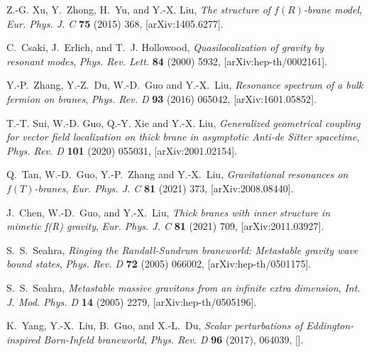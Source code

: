 \begin{thebibliography}{99}
Z.-G. Xu, Y.~Zhong, H.~Yu, and Y.-X. Liu, \emph{{The structure of $f(R)$-brane
  model}}, {\emph{Eur.
  Phys. J. C} {\bfseries 75} (2015) 368},
  [{{\ttfamily arXiv:1405.6277}}].

C.~Csaki, J.~Erlich, and T.~J. Hollowood, \emph{{Quasilocalization of gravity by
  resonant modes}},
 {\emph{Phys. Rev. Lett.}
  {\bfseries 84} (2000) 5932},
  [{{\ttfamily arXiv:hep-th/0002161}}].

Y.-P.~Zhang, Y.-Z.~Du, W.-D.~Guo and Y.-X.~Liu,
\emph{{Resonance spectrum of a bulk fermion on branes}},
{\emph{Phys. Rev. D}  {\bfseries93} (2016) 065042},
[{{\ttfamily arXiv:1601.05852}}].


T.-T. Sui, W.-D. Guo, Q.-Y. Xie and Y.-X. Liu,
\emph{{Generalized geometrical coupling for vector field localization on thick brane in asymptotic Anti-de
  Sitter spacetime}},
 {\emph{Phys. Rev. D}  {\bfseries101} (2020) 055031},
  [{{\ttfamily arXiv:2001.02154}}].



Q.~Tan, W.-D.~Guo, Y.-P.~Zhang and Y.-X.~Liu,
\emph{Gravitational resonances on $f(T)$-branes},
{\emph{Eur. Phys. J. C} {\bfseries 81} (2021) 373},
[{{\ttfamily arXiv:2008.08440}}].

J.~Chen, W.-D.~Guo, and Y.-X.~Liu,
\emph{Thick branes with inner structure in mimetic f(R) gravity},
{\emph{Eur. Phys. J. C} {\bfseries 81} (2021) 709},
[{{\ttfamily arXiv:2011.03927}}].

S.~S.~Seahra,
\emph{Ringing the Randall-Sundrum braneworld: Metastable gravity wave bound states},
{\emph{Phys. Rev. D} {\bfseries  72} (2005) 066002},
[{{\ttfamily arXiv:hep-th/0501175}}].

S.~S.~Seahra,
\emph{Metastable massive gravitons from an infinite extra dimension},
{\emph{Int. J. Mod. Phys. D} {\bfseries  14} (2005) 2279},
[{{\ttfamily arXiv:hep-th/0505196}}].



K.~Yang, Y.-X.~Liu, B.~Guo, and X.-L.~Du,
\emph{Scalar perturbations of Eddington-inspired Born-Infeld braneworld},
{\emph{Phys. Rev. D}  {\bfseries 96} (2017), 064039},
[{{}}].



\end{thebibliography}
